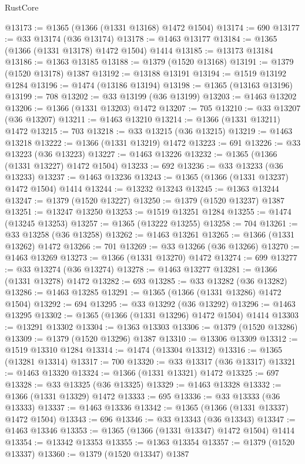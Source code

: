 \begin{lexlean}{RustCore}
\begin{coremodule}
@13173 := @1365 (@1366 (@1331 @13168) @1472 @1504)
@13174 := 690
@13177 := @33 @13174 (@36 @13174)
@13178 := @1463 @13177
@13184 := @1365 (@1366 (@1331 @13178) @1472 @1504) @1414
@13185 := @13173 @13184
@13186 := @1363 @13185
@13188 := @1379 (@1520 @13168)
@13191 := @1379 (@1520 @13178) @1387
@13192 := @13188 @13191
@13194 := @1519 @13192 @1284
@13196 := @1474 (@13186 @13194)
@13198 := @1365 (@13163 @13196)
@13199 := 708
@13202 := @33 @13199 (@36 @13199)
@13203 := @1463 @13202
@13206 := @1366 (@1331 @13203) @1472
@13207 := 705
@13210 := @33 @13207 (@36 @13207)
@13211 := @1463 @13210
@13214 := @1366 (@1331 @13211) @1472
@13215 := 703
@13218 := @33 @13215 (@36 @13215)
@13219 := @1463 @13218
@13222 := @1366 (@1331 @13219) @1472
@13223 := 691
@13226 := @33 @13223 (@36 @13223)
@13227 := @1463 @13226
@13232 := @1365 (@1366 (@1331 @13227) @1472 @1504)
@13233 := 692
@13236 := @33 @13233 (@36 @13233)
@13237 := @1463 @13236
@13243 := @1365 (@1366 (@1331 @13237) @1472 @1504) @1414
@13244 := @13232 @13243
@13245 := @1363 @13244
@13247 := @1379 (@1520 @13227)
@13250 := @1379 (@1520 @13237) @1387
@13251 := @13247 @13250
@13253 := @1519 @13251 @1284
@13255 := @1474 (@13245 @13253)
@13257 := @1365 (@13222 @13255)
@13258 := 704
@13261 := @33 @13258 (@36 @13258)
@13262 := @1463 @13261
@13265 := @1366 (@1331 @13262) @1472
@13266 := 701
@13269 := @33 @13266 (@36 @13266)
@13270 := @1463 @13269
@13273 := @1366 (@1331 @13270) @1472
@13274 := 699
@13277 := @33 @13274 (@36 @13274)
@13278 := @1463 @13277
@13281 := @1366 (@1331 @13278) @1472
@13282 := 693
@13285 := @33 @13282 (@36 @13282)
@13286 := @1463 @13285
@13291 := @1365 (@1366 (@1331 @13286) @1472 @1504)
@13292 := 694
@13295 := @33 @13292 (@36 @13292)
@13296 := @1463 @13295
@13302 := @1365 (@1366 (@1331 @13296) @1472 @1504) @1414
@13303 := @13291 @13302
@13304 := @1363 @13303
@13306 := @1379 (@1520 @13286)
@13309 := @1379 (@1520 @13296) @1387
@13310 := @13306 @13309
@13312 := @1519 @13310 @1284
@13314 := @1474 (@13304 @13312)
@13316 := @1365 (@13281 @13314)
@13317 := 700
@13320 := @33 @13317 (@36 @13317)
@13321 := @1463 @13320
@13324 := @1366 (@1331 @13321) @1472
@13325 := 697
@13328 := @33 @13325 (@36 @13325)
@13329 := @1463 @13328
@13332 := @1366 (@1331 @13329) @1472
@13333 := 695
@13336 := @33 @13333 (@36 @13333)
@13337 := @1463 @13336
@13342 := @1365 (@1366 (@1331 @13337) @1472 @1504)
@13343 := 696
@13346 := @33 @13343 (@36 @13343)
@13347 := @1463 @13346
@13353 := @1365 (@1366 (@1331 @13347) @1472 @1504) @1414
@13354 := @13342 @13353
@13355 := @1363 @13354
@13357 := @1379 (@1520 @13337)
@13360 := @1379 (@1520 @13347) @1387

\end{coremodule}
\end{lexlean}
